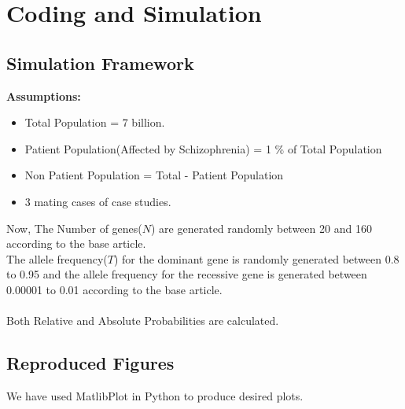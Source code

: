 \documentclass{article}
\begin{document}
\newpage
\null\newpage

\section{Coding and Simulation}

\subsection{Simulation Framework}
    \hspace{7mm} \textbf{Assumptions:}
\begin{itemize}
    \item Total Population = 7 billion.
    \item Patient Population(Affected by Schizophrenia) = 1 \% of Total Population
    \item Non Patient Population = Total - Patient Population
    \item 3 mating cases of case studies. 
\end{itemize}
Now, The Number of genes($N$) are generated randomly between 20 and 160 according to the base article. \\
The allele frequency($T$) for the dominant gene is randomly generated between 0.8 to 0.95 and the allele frequency for the recessive gene is generated between 0.00001 to 0.01 according to the base article. \\ \\ 
Both Relative and Absolute Probabilities are calculated.  

\subsection{Reproduced Figures}

We have used MatlibPlot in Python to produce desired plots.
\end{document}
